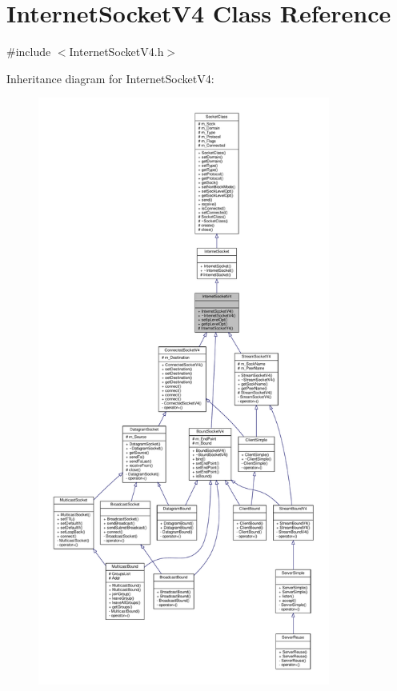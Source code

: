 \hypertarget{classInternetSocketV4}{}\section{Internet\+Socket\+V4 Class Reference}
\label{classInternetSocketV4}


{\ttfamily \#include $<$Internet\+Socket\+V4.\+h$>$}



Inheritance diagram for Internet\+Socket\+V4\+:\nopagebreak
\begin{figure}[H]
\begin{center}
\leavevmode
\includegraphics[height=550pt]{classInternetSocketV4__inherit__graph}
\end{center}
\end{figure}
